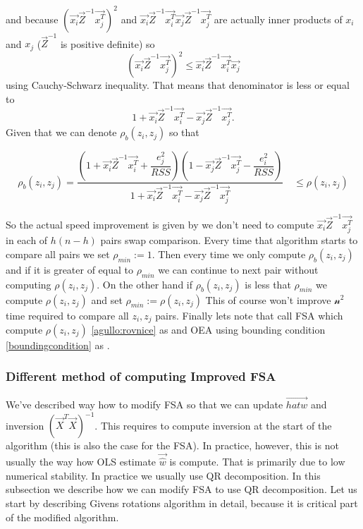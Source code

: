 and because $(\vec{x_i}\vec{Z}^{-1}\vec{x_j^T})^2$ and $\vec{x_i}\vec{Z}^{-1}\vec{x_i^T}\vec{x_j}\vec{Z}^{-1}\vec{x_j^T} $ are actually inner products of $x_i$ and $x_j$  ($\vec{Z}^{-1}$ is positive definite) so 
\begin{equation}
	(\vec{x_i}\vec{Z}^{-1}\vec{x_j^T})^2 \leq \vec{x_i}\vec{Z}^{-1}\vec{x_i^T}\vec{x_j}
\end{equation}
using Cauchy-Schwarz inequality. That means that denominator is less or equal to
\begin{equation}
	1 + \vec{x_i}\vec{Z}^{-1}\vec{x_i^T}  - \vec{x_j}\vec{Z}^{-1}\vec{x_j^T}.
\end{equation}
Given that we can denote $\rho_b(z_i, z_j)$ so that


\begin{equation} \label{boundingcondition}
	\rho_b(z_i, z_j) = \dfrac{(1+\vec{x_i}\vec{Z}^{-1}\vec{x_i^T} + \dfrac{e_j^2}{RSS})
	(1 - \vec{x_j}\vec{Z}^{-1}\vec{x_j^T} - \dfrac{e_i^2}{RSS} )}{1 + \vec{x_i}\vec{Z}^{-1}\vec{x_i^T}  - \vec{x_j}\vec{Z}^{-1}\vec{x_j^T}} \quad \leq \rho(z_i, z_j)
\end{equation}

So the actual speed improvement is given by we don't need to compute $\vec{x_i}\vec{Z}^{-1}\vec{x_j^T}$ in each of $h(n-h)$ pairs swap comparison. Every time that algorithm starts to compare all pairs we set $\rho_{min} :=1$. Then every time we only compute $\rho_b(z_i, z_j)$ and if it is greater of equal to $\rho_{min}$ we can continue to next pair without computing $\rho(z_i, z_j)$. On the other hand if $\rho_b(z_i, z_j)$ is less that  $\rho_{min}$ we compute $\rho(z_i, z_j)$ and set $\rho_{min} := \rho(z_i, z_j)$ This of course won't improve $\mathcal{n^2}$ time required to compare all $z_i, z_j$ pairs.
Finally lets note that \cite{agullo2001new} call FSA  which compute $\rho(z_i, z_j)$  \ref{agullo:rovnice} as  and OEA using bounding condition \ref{boundingcondition} as  .




\subsubsection{Different method of computing Improved FSA}

We've described way how to modify FSA so that we can update $\vec{hat{w}}$ and inversion $(\vec{X}^T \vec{X})^{-1}$. This requires to compute inversion at the start of the algorithm (this is also the case for the FSA). In practice, however, this is not usually the way how OLS estimate $\vec{\hat{w}}$ is compute. That is primarily due to low numerical stability. In practice we usually use QR decomposition. In this subsection we describe how we can modify FSA to use QR decomposition. Let us start by describing Givens rotations algorithm in detail, because it is critical part of the modified algorithm. 

